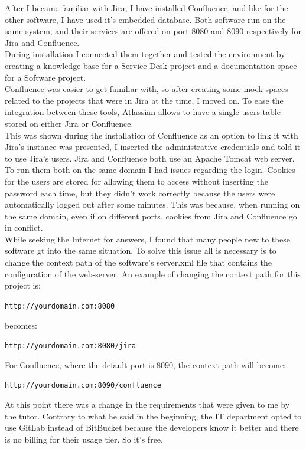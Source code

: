 	After I became familiar with Jira, I have installed Confluence, and like for the other software, I have used it's embedded database.
	Both software run on the same system, and their services are offered on port 8080 and 8090 respectively for Jira and Confluence.\\
	During installation I connected them together and tested the environment by creating a knowledge base for a Service Desk project and a documentation space for a Software project.\\
	Confluence was easier to get familiar with, so after creating some mock spaces related to the projects that were in Jira at the time, I moved on.
	To ease the integration between these tools, Atlassian allows to have a single users table stored on either Jira or Confluence.\\
	This was shown during the installation of Confluence as an option to link it with Jira's instance was presented, I inserted the administrative credentials and told it to use Jira's users.
	Jira and Confluence both use an Apache Tomcat web server.
	To run them both on the same domain I had issues regarding the login.
	Cookies for the users are stored for allowing them to access without inserting the password each time, but they didn't work correctly because the users were automatically logged out after some minutes.
	This was because, when running on the same domain, even if on different ports, cookies from Jira and Confluence go in conflict.\\
	While seeking the Internet for answers, I found that many people new to these software gt into the same situation.
	To solve this issue all is necessary is to change the context path of the software's server.xml file that contains the configuration of the web-server.
	An example of changing the context path for this project is:
	\begin{center}
		\texttt{http://yourdomain.com:8080}
	\end{center}
	becomes:
	\begin{center}
		\texttt{http://yourdomain.com:8080/jira}
	\end{center}
	For Confluence, where the default port is 8090, the context path will become:
	\begin{center}
		\texttt{http://yourdomain.com:8090/confluence}
	\end{center}
	At this point there was a change in the requirements that were given to me by the tutor.
	Contrary to what he said in the beginning, the IT department opted to use GitLab instead of BitBucket because the developers know it better and there is no billing for their usage tier.	
	So it's free.
	
